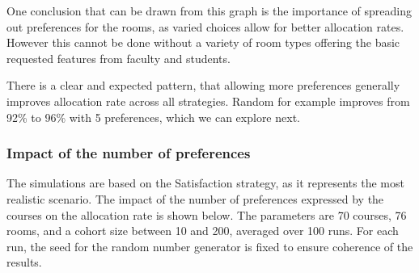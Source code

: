 \documentclass[a4paper, oneside]{article}
\theoremstyle{plain}
\begin{document}
One conclusion that can be drawn from this graph is the importance of spreading out preferences for the rooms, as varied choices allow for better allocation rates. However this cannot be done without
a variety of room types offering the basic requested features from faculty and students.

There is a clear and expected pattern, that allowing more preferences generally improves allocation rate across all strategies. Random for example improves from 92\% to 96\% with 5 preferences, which we can
explore next.

\subsubsection*{Impact of the number of preferences}

The simulations are based on the Satisfaction strategy, as it represents the most realistic scenario. The impact of the number of preferences expressed by the courses on the allocation rate is shown below. The parameters are 70 courses,
76 rooms, and a cohort size between 10 and 200, averaged over 100 runs. For each run, the seed for the random number generator is fixed to ensure coherence of the results.
\end{document}
